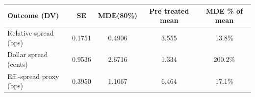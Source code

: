 \begin{tabular}{lcccc}
\toprule
Outcome (DV) & SE & MDE(80\%) & Pre treated mean & MDE \% of mean \\
\midrule
Relative spread (bps) & 0.1751 & 0.4906 & 3.555 & 13.8\% \\
Dollar spread (cents) & 0.9536 & 2.6716 & 1.334 & 200.2\% \\
Eff.-spread proxy (bps) & 0.3950 & 1.1067 & 6.464 & 17.1\% \\
\bottomrule
\end{tabular}
